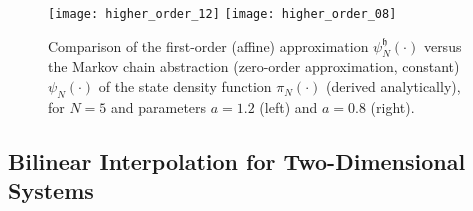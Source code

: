 \documentclass{LMCS}
\begin{document}
\begin{figure}
\centering
\texttt{[image: higher\_order\_12]}
\texttt{[image: higher\_order\_08]}
\caption{Comparison of the first-order (affine) approximation $\psi_N^{\mathfrak h}(\cdot)$ 
versus the Markov chain abstraction (zero-order approximation, constant) $\psi_N(\cdot)$ of the state density function $\pi_N(\cdot)$ (derived analytically), 
for $N = 5$ and parameters $a=1.2$ (left) and $a=0.8$ (right).} 
\label{fig:higher_order_density}
\end{figure}

\subsection{Bilinear Interpolation for Two-Dimensional Systems}
\end{document}

